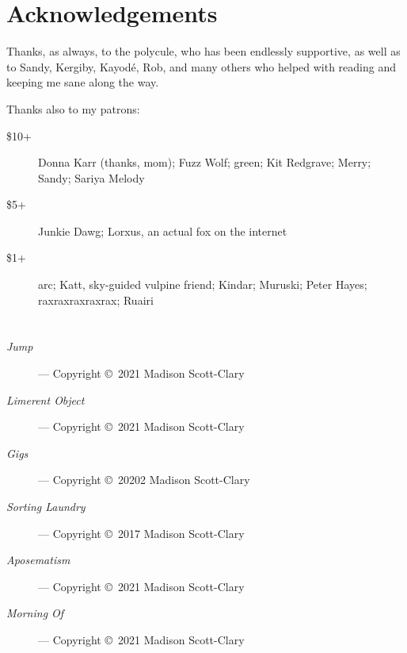 \chapter*{Acknowledgements}

Thanks, as always, to the polycule, who has been endlessly supportive, as well as to Sandy, Kergiby, Kayodé, Rob, and many others who helped with reading and keeping me sane along the way.

Thanks also to my patrons:

\begin{description}
    \item[\$10+]
    Donna Karr (thanks, mom); Fuzz Wolf; green; Kit Redgrave; Merry; Sandy; Sariya Melody

    \item[\$5+]
    Junkie Dawg; Lorxus, an actual fox on the internet

    \item[\$1+]
    arc; Katt, sky-guided vulpine friend; Kindar; Muruski; Peter Hayes; raxraxraxraxrax; Ruairi
\end{description}

\chapter*{}

\begin{description}
    \item[\emph{Jump}]
    --- Copyright \copyright\ 2021 Madison Scott-Clary

    \item[\emph{Limerent Object}]
    --- Copyright \copyright\ 2021 Madison Scott-Clary

    \item[\emph{Gigs}]
    --- Copyright \copyright\ 20202 Madison Scott-Clary

    \item[\emph{Sorting Laundry}]
    --- Copyright \copyright\ 2017 Madison Scott-Clary

    \item[\emph{Aposematism}]
    --- Copyright \copyright\ 2021 Madison Scott-Clary

    \item[\emph{Morning Of}]
    --- Copyright \copyright\ 2021 Madison Scott-Clary
\end{description}
\newpage
\thispagestyle{empty}
\null
\vfill

